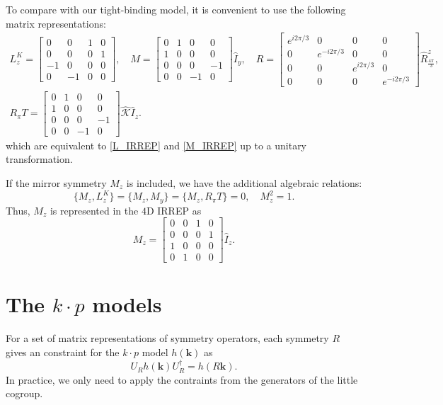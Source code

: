 \documentclass[aps,prl,twocolumn,noshowpacs,superscriptaddress]{revtex4-1}
\def \K {\hat{\mathcal{K}}}
\begin{document}
To compare with our tight-binding model, it is convenient to use the following matrix representations:
\begin{gather}\label{K_IRREP}
	L_z^K=\begin{bmatrix}
		0 & 0 & 1 & 0\\
		0 & 0 & 0 & 1\\
		-1 & 0 & 0 & 0\\
		0 & -1 & 0 & 0
	\end{bmatrix},\quad M=\begin{bmatrix}
		0 & 1 & 0 & 0\\
		1 & 0 & 0 & 0\\
		0 & 0 & 0 & -1\\
		0 & 0 & -1 & 0
	\end{bmatrix}\hat{I}_{y},\quad 
	R=\begin{bmatrix}
		e^{i2\pi/3} & 0 & 0 & 0\\
		0 & e^{-i2\pi/3} & 0 & 0\\
		0 & 0 & e^{i2\pi/3} & 0\\
		0 & 0 & 0 & e^{-i2\pi/3}
	\end{bmatrix}\hat{R}^z_{\frac{4\pi}{3}},\\
	R_{\pi}T=\begin{bmatrix}
		0 & 1 & 0 & 0\\
		1 & 0 & 0 & 0\\
		0 & 0 & 0 & -1\\
		0 & 0 & -1 & 0
	\end{bmatrix}\K\hat{I}_z.
\end{gather}
which are equivalent to \eqref{L_IRREP} and \eqref{M_IRREP} up to a unitary transformation.

If the mirror symmetry $M_z$ is included, we have the additional algebraic relations:
\begin{equation}
	\{M_z,L_z^K\}=\{M_z,M_y\}=\{M_z,R_\pi T\}=0, \quad M_z^2=1.
\end{equation}
Thus, $M_z$ is represented in the $4$D IRREP as
\begin{equation}\label{Mz_Rep}
	M_z=\begin{bmatrix}
		0 & 0 & 1 & 0\\
		0 & 0 & 0 & 1\\
		1 & 0 & 0 & 0\\
		0 & 1 & 0 & 0
	\end{bmatrix}\hat{I}_z.
\end{equation}


\section{The $k\cdot p$ models}
For a set of matrix representations of symmetry operators, each symmetry $R$ gives an constraint for the $k\cdot p$ model $h(\bm{k})$ as
\begin{equation}
	U_R h(\bm{k}) U_R^\dagger=h(R\bm{k}).
\end{equation}
In practice, we only need to apply the contraints from the generators of the little cogroup. 
\end{document}
